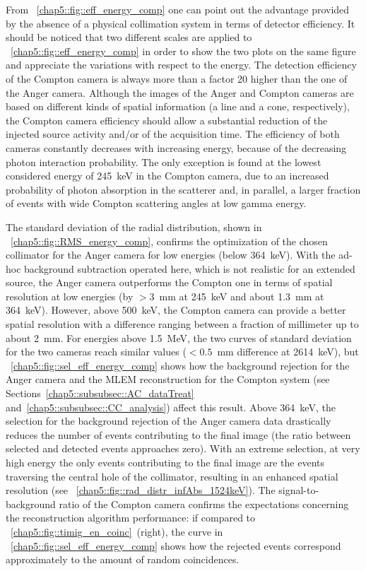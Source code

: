 From \figurename~\ref{chap5::fig::eff_energy_comp} one can point out the advantage provided by the absence of a physical collimation system in terms of detector efficiency. It should be noticed that two different scales are applied to \figurename~\ref{chap5::fig::eff_energy_comp} in order to show the two plots on the same figure and appreciate the variations with respect to the energy. The detection efficiency of the Compton camera is always more than a factor 20 higher than the one of the Anger camera. Although the images of the Anger and Compton cameras are based on different kinds of spatial information (a line and a cone, respectively), the Compton camera efficiency should allow a substantial reduction of the injected source activity and/or of the acquisition time. The efficiency of both cameras constantly decreases with increasing energy, because of the decreasing photon interaction probability. The only exception is found at the lowest considered energy of 245~keV in the Compton camera, due to an increased  probability of photon absorption in the scatterer and, in parallel, a larger fraction of events with wide Compton scattering angles at low gamma energy.

The standard deviation of the radial distribution, shown in \figurename~\ref{chap5::fig::RMS_energy_comp}, confirms the optimization of the chosen collimator for the Anger camera for low energies (below 364~keV). With the ad-hoc background subtraction operated here, which is not realistic for an extended source, the Anger camera outperforms the Compton one in terms of spatial resolution at low energies (by $>3$~mm at 245~keV and about 1.3~mm at 364~keV). However, above 500~keV, the Compton camera can provide a better spatial resolution with a difference ranging between a fraction of millimeter up to about 2~mm. For energies above 1.5~MeV, the two curves of standard deviation for the two cameras reach similar values ($<0.5$~mm difference at 2614~keV), but \figurename~\ref{chap5::fig::sel_eff_energy_comp} shows how the background rejection for the Anger camera and the MLEM reconstruction for the Compton system (see Sections~\ref{chap5::subsubsec::AC_dataTreat} and~\ref{chap5::subsubsec::CC_analysis}) affect this result. Above 364~keV, the selection for the background rejection of the Anger camera data drastically reduces the number of events contributing to the final image (the ratio between selected and detected events approaches zero). With an extreme selection, at very high energy the only events contributing to the final image are the events traversing the central hole of the collimator, resulting in an enhanced spatial resolution (see \figurename~\ref{chap5::fig::rad_distr_infAbs_1524keV}). The signal-to-background ratio of the Compton camera confirms the expectations concerning the reconstruction algorithm performance: if compared to \figurename~\ref{chap5::fig::timig_en_coinc}~(right), the curve in \figurename~\ref{chap5::fig::sel_eff_energy_comp} shows how the rejected events correspond approximately to the amount of random coincidences.
              

